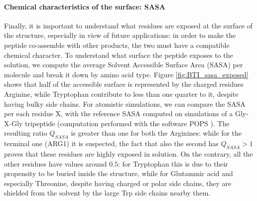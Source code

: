 \paragraph{Chemical characteristics of the surface: SASA} Finally, it is important to understand what residues are exposed at the surface of the structure, especially in view of future applications: in order to make the peptide co-assemble with other products, the two must have a compatible chemical character. To understand what surface the peptide exposes to the solution, we compute the average Solvent Accessible Surface Area (SASA) per molecule and break it down by amino acid type. Figure \ref{fig:BTI_sasa_exposed} shows that half of the accessible surface is represented by the charged residues Arginine, while Tryptophan contribute to less than one quarter to it, despite having bulky side chains. For atomistic simulations, we can compare the SASA per each residue X, with the reference SASA computed on simulations of a Gly-X-Gly tripeptide (computation performed with the software POPS \cite{pops}). The resulting ratio $Q_{SASA}$ is greater than one for both the Arginines: while for the terminal one (ARG1) it is suspected, the fact that also the second has $Q_{SASA}>1$ proves that these residues are highly exposed in solution. On the contrary, all the other residues have values around $0.5$: for Tryptophan this is due to their propensity to be buried inside the structure, while for Glutammic acid and especially Threonine, despite having charged or polar side chains, they are shielded from the solvent by the large Trp side chains nearby them.
